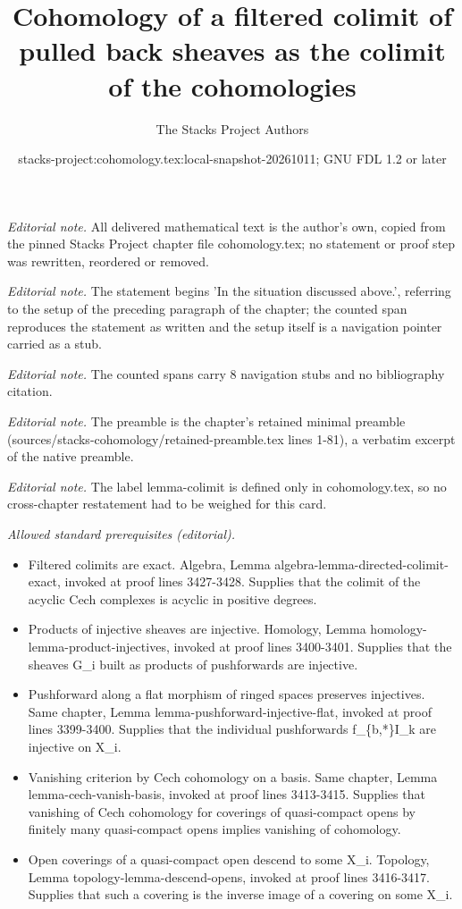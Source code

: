 \documentclass[10pt,a4paper]{amsart}
\title{Cohomology of a filtered colimit of pulled back sheaves as the colimit of the cohomologies}
\author{The Stacks Project Authors}
\date{stacks-project:cohomology.tex:local-snapshot-20261011; GNU FDL 1.2 or later}
\theoremstyle{plain}
\theoremstyle{definition}
\theoremstyle{remark}
\numberwithin{equation}{subsection}
\begin{document}
\maketitle
\noindent\textit{Editorial note.} All delivered mathematical text is the author's own, copied from the pinned Stacks Project chapter file cohomology.tex; no statement or proof step was rewritten, reordered or removed.\par\medskip
\noindent\textit{Editorial note.} The statement begins 'In the situation discussed above.', referring to the setup of the preceding paragraph of the chapter; the counted span reproduces the statement as written and the setup itself is a navigation pointer carried as a stub.\par\medskip
\noindent\textit{Editorial note.} The counted spans carry 8 navigation stubs and no bibliography citation.\par\medskip
\noindent\textit{Editorial note.} The preamble is the chapter's retained minimal preamble (sources/stacks-cohomology/retained-preamble.tex lines 1-81), a verbatim excerpt of the native preamble.\par\medskip
\noindent\textit{Editorial note.} The label lemma-colimit is defined only in cohomology.tex, so no cross-chapter restatement had to be weighed for this card.\par\medskip
\noindent\textit{Allowed standard prerequisites (editorial).}\begin{itemize}
\item Filtered colimits are exact. Algebra, Lemma algebra-lemma-directed-colimit-exact, invoked at proof lines 3427-3428. Supplies that the colimit of the acyclic Cech complexes is acyclic in positive degrees.
\item Products of injective sheaves are injective. Homology, Lemma homology-lemma-product-injectives, invoked at proof lines 3400-3401. Supplies that the sheaves G\_i built as products of pushforwards are injective.
\item Pushforward along a flat morphism of ringed spaces preserves injectives. Same chapter, Lemma lemma-pushforward-injective-flat, invoked at proof lines 3399-3400. Supplies that the individual pushforwards f\_\{b,*\}I\_k are injective on X\_i.
\item Vanishing criterion by Cech cohomology on a basis. Same chapter, Lemma lemma-cech-vanish-basis, invoked at proof lines 3413-3415. Supplies that vanishing of Cech cohomology for coverings of quasi-compact opens by finitely many quasi-compact opens implies vanishing of cohomology.
\item Open coverings of a quasi-compact open descend to some X\_i. Topology, Lemma topology-lemma-descend-opens, invoked at proof lines 3416-3417. Supplies that such a covering is the inverse image of a covering on some X\_i.
\end{itemize}\medskip
\end{document}
